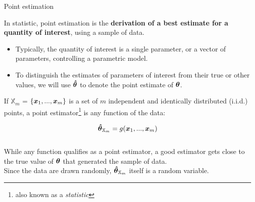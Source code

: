 
\begin{frame}[t]{Point estimation}

    In statistic, 
    \gls{point estimation}
    is the {\bf derivation of a best estimate
    for a quantity of interest}, using a sample of data.
    \begin{itemize}
        \item
        Typically, the quantity of interest is a 
        single parameter, or a vector of parameters, 
        controlling a parametric model.
        \item
        To distinguish the estimates of parameters of
        interest from their true or other values,
        we will use $\boldsymbol{\hat{\theta}}$ to denote the 
        point estimate of $\boldsymbol{\theta}$.
    \end{itemize}

    \vspace{0.1cm}

    If $\mathbb{X}_{m}$ = $\{\boldsymbol{x}_{1}, ..., \boldsymbol{x}_{m}\}$ is a set
    of $m$ independent and identically distributed (i.i.d.) points,
    a \gls{point estimator}\footnote{
        also known as a {\em statistic}} 
    is any function of the data:

    \begin{equation}
        \boldsymbol{\hat{\theta}}_{\mathbb{X}_{m}} = g(\boldsymbol{x}_{1}, ..., \boldsymbol{x}_{m})
        \label{eq:point_estimator}
    \end{equation}\\

    \vspace{0.2cm}
    While any function qualifies as a \gls{point estimator}, 
    a good estimator gets close to the true value of $\boldsymbol{\theta}$
    that generated the sample of data.\\

    \vspace{0.2cm}
    Since the data are drawn randomly, 
    $\boldsymbol{\hat{\theta}}_{\mathbb{X}_{m}}$ itself is a random variable.\\

\end{frame}